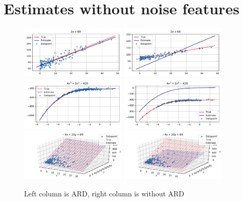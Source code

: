 \documentclass[12pt]{article}
\begin{document}
    \section{Estimates without noise features}
        \begin{figure}[H]
            \centering
            \caption{Left column is ARD, right column is without ARD} \label{fig:appendixestimates}
            \includegraphics[width=0.45\textwidth]{f_1_noise0_estplot_ard}
            \includegraphics[width=0.45\textwidth]{f_1_noise0_estplot_regular}
            \includegraphics[width=0.45\textwidth]{f_2_noise0_estplot_ard}
            \includegraphics[width=0.45\textwidth]{f_2_noise0_estplot_regular}
            \includegraphics[width=0.45\textwidth]{f_3_noise0_estplot_ard}
            \includegraphics[width=0.45\textwidth]{f_3_noise0_estplot_regular}

\end{figure}
\end{document}
